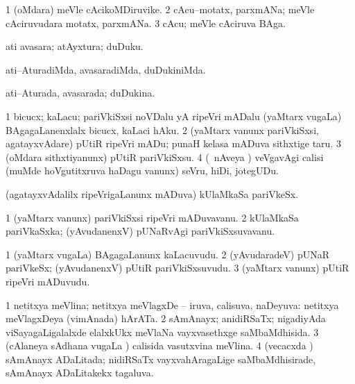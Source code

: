 \bentry
{}
\gl{\nA}
\bmng
\bnum
\num{1} (oMdara) meVle cAcikoMDiruvike. 
\num{2} cAcu--motatx, parxmANa; meVle cAciruvudara motatx, parxmANa. 
\num{3} cAcu; meVle cAciruva BAga. 
\enum
\emng
\eentry

\bentry
{}
\gl{\nA}
\bmng
ati avasara; atAyxtura; duDuku. 
\emng
\eentry

\bentry
{}
\gl{\kirxvi}
\bmng
ati--AturadiMda, avasaradiMda, duDukiniMda. 
\emng
\eentry

\bentry
{}
\gl{\gu}
\bmng
ati--Aturada, avasarada; duDukina. 
\emng
\eentry

\bentry
{}
\gl{\sakirx}
\bmng
\bnum
\num{1} bicucx; kaLacu; pariVkiSxsi noVDalu yA ripeVri mADalu (yaMtarx \mo vugaLa) BAgagaLanenxlalx bicucx, kaLaci hAku. 
\num{2} (yaMtarx \mo vanunx pariVkiSxsi, agatayxvAdare) pUtiR ripeVri mADu; punaH kelasa mADuva sithxtige taru. 
\num{3} (oMdara sithxtiyanunx) pUtiR pariVkiSxsu. 
\num{4} (\kanmu\ nAveya \vi) veVgavAgi calisi (muMde hoVgutitxruva haDagu \mo vanunx) seVru, hiDi, jotegUDu. 
\enum
\emng
\eentry

\bentry
{}
\gl{\nA}
\bmng
(agatayxvAdalilx ripeVrigaLanunx mADuva) kUlaMkaSa pariVkeSx. 
\emng
\eentry

\bentry
{}
\gl{\nA}
\bmng
\bnum
\num{1} (yaMtarx \mo vanunx) pariVkiSxsi ripeVri mADuvavanu. 
\num{2} kUlaMkaSa pariVkaSxka; (yAvudanenxV) pUNaRvAgi pariVkiSxsuvavanu. 
\enum
\emng
\eentry

\bentry
{}
\gl{\nA}
\bmng
\bnum
\num{1} (yaMtarx \mo vugaLa) BAgagaLanunx kaLacuvudu. 
\num{2} (yAvudaradeV) pUNaR pariVkeSx; (yAvudanenxV) pUtiR pariVkiSxsuvudu. 
\num{3} (yaMtarx \mo vanunx) pUtiR ripeVri mADuvudu. 
\enum
\emng
\eentry

\bentry
{}
\gl{\gu}
\bmng
\bnum
\num{1} netitxya meVlina; netitxya meVlagxDe -- iruva, calisuva, naDeyuva:  netitxya meVlagxDeya (vimAnada) hArATa. 
\num{2} sAmAnayx; anidiRSaTx; nigadiyAda viSayagaLigalalxde elalxkUkx meVlaNa vayxvasethxge saMbaMdhisida. 
\num{3} (cAlaneya sAdhana \mo vugaLa \vi) calisida vasutxvina meVlina. 
\num{4} (vecacxda \vi) sAmAnayx ADaLitada; nidiRSaTx vayxvahAragaLige saMbaMdhisirade, sAmAnayx ADaLitakekx tagaluva. 
\enum
\emng
\eentry

